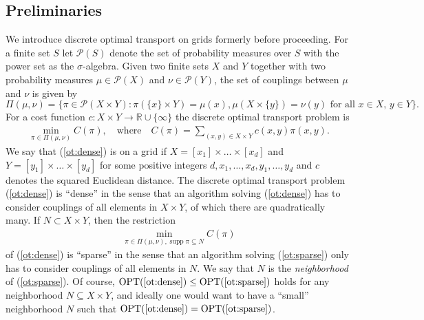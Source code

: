 \documentclass[a4paper,UKenglish,cleveref, autoref, thm-restate]{lipics-v2021}
\DeclareMathOperator{\supp}{supp}
\DeclareMathOperator{\OPT}{OPT}
\begin{document}
\subsection{Preliminaries}
We introduce discrete optimal transport on grids formerly before proceeding.
For a finite set $S$ let $\mathcal{P}(S)$ denote the set of probability measures over $S$ with the power set as the $\sigma$-algebra.
Given two finite sets $X$ and $Y$ together with two probability measures $\mu \in \mathcal{P}(X)$ and $\nu \in \mathcal{P}(Y)$, the set of couplings between $\mu$ and $\nu$ is given by
\[
\Pi(\mu,\nu) = \{\pi \in \mathcal{P}(X \times Y): \pi(\{x\} \times Y) = \mu(x), \mu(X \times \{y\}) = \nu(y) \text{ for all $x \in X$, $y \in Y$}\}.
\]
For a cost function $c: X \times Y \rightarrow \mathbb{R} \cup \{\infty\}$ the discrete optimal transport problem is
\begin{align}\tag{$P$}\label{ot:dense}
\min_{\pi \in \Pi(\mu,\nu)} C(\pi), \quad\text{where}\quad C(\pi) = \sum_{(x,y) \in X \times Y} c(x,y)\pi(x,y).
\end{align}
We say that (\ref{ot:dense}) is on a grid if $X = [x_1] \times \dots \times [x_d]$ and $Y = [y_1] \times \dots \times [y_d]$ for some positive integers $d, x_1, \dots, x_d, y_1, \dots, y_d$ and $c$ denotes the squared Euclidean distance.
The discrete optimal transport problem (\ref{ot:dense}) is ``dense'' in the sense that an algorithm solving (\ref{ot:dense}) has to consider couplings of all elements in $X \times Y$, of which there are quadratically many.
If $N \subset X \times Y$, then the restriction
\begin{align}\tag{$P'$}\label{ot:sparse}
\min_{\pi \in \Pi(\mu,\nu), \supp \pi \subseteq N} C(\pi)
\end{align}
of (\ref{ot:dense}) is ``sparse'' in the sense that an algorithm solving (\ref{ot:sparse}) only has to consider couplings of all elements in $N$.
We say that $N$ is the \emph{neighborhood} of (\ref{ot:sparse}).
Of course, $\OPT(\text{\ref{ot:dense}}) \leq \OPT(\text{\ref{ot:sparse}})$ holds for any neighborhood $N \subseteq X \times Y$, and ideally one would want to have a ``small'' neighborhood $N$ such that $\OPT(\text{\ref{ot:dense}}) = \OPT(\text{\ref{ot:sparse}})$.
\end{document}
